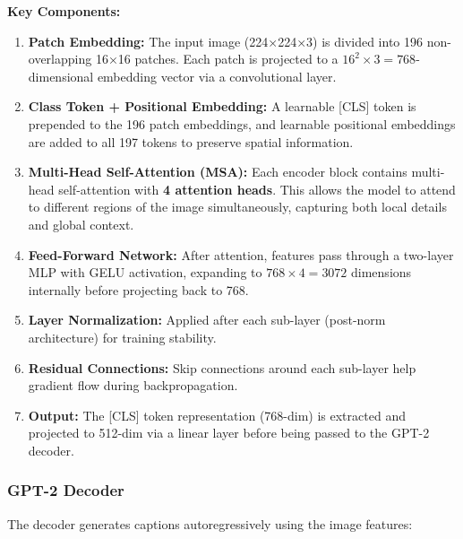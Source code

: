 \documentclass[12pt]{article}
\begin{document}
\textbf{Key Components:}

\begin{enumerate}
\item \textbf{Patch Embedding:} The input image (224×224×3) is divided into 196 non-overlapping 16×16 patches. Each patch is projected to a $16^2 \times 3 = 768$-dimensional embedding vector via a convolutional layer.

\item \textbf{Class Token + Positional Embedding:} A learnable [CLS] token is prepended to the 196 patch embeddings, and learnable positional embeddings are added to all 197 tokens to preserve spatial information.

\item \textbf{Multi-Head Self-Attention (MSA):} Each encoder block contains multi-head self-attention with \textbf{4 attention heads}. This allows the model to attend to different regions of the image simultaneously, capturing both local details and global context.

\item \textbf{Feed-Forward Network:} After attention, features pass through a two-layer MLP with GELU activation, expanding to $768 \times 4 = 3072$ dimensions internally before projecting back to 768.

\item \textbf{Layer Normalization:} Applied after each sub-layer (post-norm architecture) for training stability.

\item \textbf{Residual Connections:} Skip connections around each sub-layer help gradient flow during backpropagation.

\item \textbf{Output:} The [CLS] token representation (768-dim) is extracted and projected to 512-dim via a linear layer before being passed to the GPT-2 decoder.
\end{enumerate}

\subsubsection{GPT-2 Decoder}
The decoder generates captions autoregressively using the image features:
\end{document}
